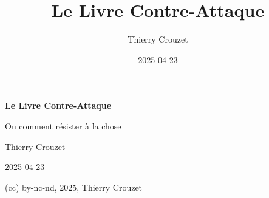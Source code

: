 \documentclass[a5paper, 10pt, twoside]{book}
\begin{document}

\title{Le Livre Contre-Attaque}

\author{Thierry Crouzet}

\date{2025-04-23}

\newcommand{\subtitle}{Ou comment résister à la chose}


\newcommand{\rights}{(cc) by-nc-nd, 2025, Thierry Crouzet}

\begin{titlepage}
    \centering
    {\huge\bfseries Le Livre Contre-Attaque\par}
        \vspace{0.5cm}
    {\large Ou comment résister à la chose\par}
        \vspace{2cm}
        {\large Thierry Crouzet\par}
        \vfill
        \vspace{0.5cm}
        {\large 2025-04-23\par}
            \vspace{0.5cm}
    {\small (cc) by-nc-nd, 2025, Thierry Crouzet\par}
    \end{titlepage}
\cleardoublepage


\vspace*{8\baselineskip}
\end{document}

